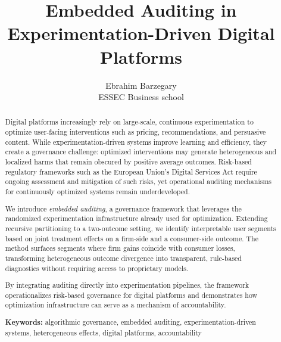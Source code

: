 \documentclass[11pt,letterpaper,english]{article}
\theoremstyle{definition}
\theoremstyle{definition}
\begin{document}
\title{Embedded Auditing in Experimentation-Driven Digital Platforms}


\author{
       Ebrahim Barzegary \\ %
        ESSEC Business school\\
 }

\thispagestyle{empty}

\date{}
\maketitle

\begin{abstract}

Digital platforms increasingly rely on large-scale, continuous experimentation to optimize user-facing interventions such as pricing, recommendations, and persuasive content. While experimentation-driven systems improve learning and efficiency, they create a governance challenge: optimized interventions may generate heterogeneous and localized harms that remain obscured by positive average outcomes. Risk-based regulatory frameworks such as the European Union’s Digital Services Act require ongoing assessment and mitigation of such risks, yet operational auditing mechanisms for continuously optimized systems remain underdeveloped.

We introduce \emph{embedded auditing}, a governance framework that leverages the randomized experimentation infrastructure already used for optimization. Extending recursive partitioning to a two-outcome setting, we identify interpretable user segments based on joint treatment effects on a firm-side and a consumer-side outcome. The method surfaces segments where firm gains coincide with consumer losses, transforming heterogeneous outcome divergence into transparent, rule-based diagnostics without requiring access to proprietary models.

By integrating auditing directly into experimentation pipelines, the framework operationalizes risk-based governance for digital platforms and demonstrates how optimization infrastructure can serve as a mechanism of accountability.

\vspace{5mm}
\noindent \textbf{Keywords:} algorithmic governance, embedded auditing, experimentation-driven systems, heterogeneous effects, digital platforms, accountability
\end{abstract}
\end{document}
